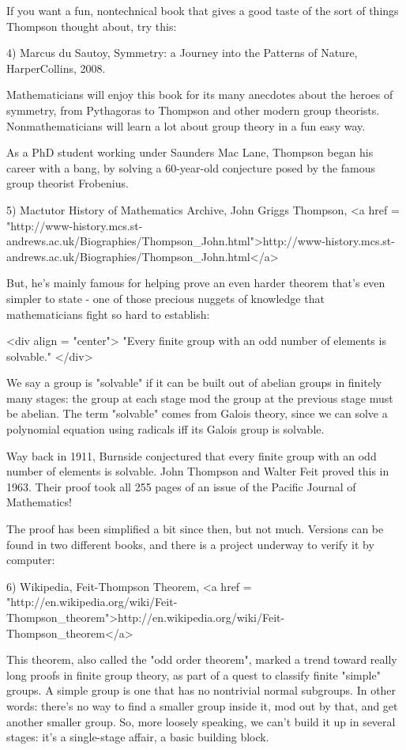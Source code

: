 If you want a fun, nontechnical book that gives a good taste of
the sort of things Thompson thought about, try this:

4) Marcus du Sautoy, Symmetry: a Journey into the Patterns of 
Nature, HarperCollins, 2008.

Mathematicians will enjoy this book for its many anecdotes about
the heroes of symmetry, from Pythagoras to Thompson and other
modern group theorists.  Nonmathematicians will learn a lot about
group theory in a fun easy way.

As a PhD student working under Saunders Mac Lane, Thompson began 
his career with a bang, by solving a 60-year-old conjecture posed 
by the famous group theorist Frobenius.  

5) Mactutor History of Mathematics Archive, John Griggs Thompson,
<a href = "http://www-history.mcs.st-andrews.ac.uk/Biographies/Thompson_John.html">http://www-history.mcs.st-andrews.ac.uk/Biographies/Thompson_John.html</a>

But, he's mainly famous for helping prove an even harder theorem 
that's even simpler to state - one of those precious nuggets of 
knowledge that mathematicians fight so hard to establish:


<div align = "center">
"Every finite group with an odd number of elements is solvable."
</div>

We say a group is "solvable" if it can be built out of abelian
groups in finitely many stages: the group at each stage mod the 
group at the previous stage must be abelian.  The term "solvable"
comes from Galois theory, since we can solve a polynomial equation
using radicals iff its Galois group is solvable.  

Way back in 1911, Burnside conjectured that every finite group
with an odd number of elements is solvable.  John Thompson and 
Walter Feit proved this in 1963.  Their proof took all 255 pages 
of an issue of the Pacific Journal of Mathematics!

The proof has been simplified a bit since then, but not much.
Versions can be found in two different books, and there is a 
project underway to verify it by computer:

6) Wikipedia, Feit-Thompson Theorem,
<a href = "http://en.wikipedia.org/wiki/Feit-Thompson_theorem">http://en.wikipedia.org/wiki/Feit-Thompson_theorem</a>

This theorem, also called the "odd order theorem", marked a trend 
toward really long proofs in finite group theory, as part of a 
quest to classify finite "simple" groups.  A simple group is one 
that has no nontrivial normal subgroups.  In other words: there's 
no way to find a smaller group inside it, mod out by that, and 
get another smaller group.   So, more loosely speaking, we can't 
build it up in several stages: it's a single-stage affair, a basic 
building block.

